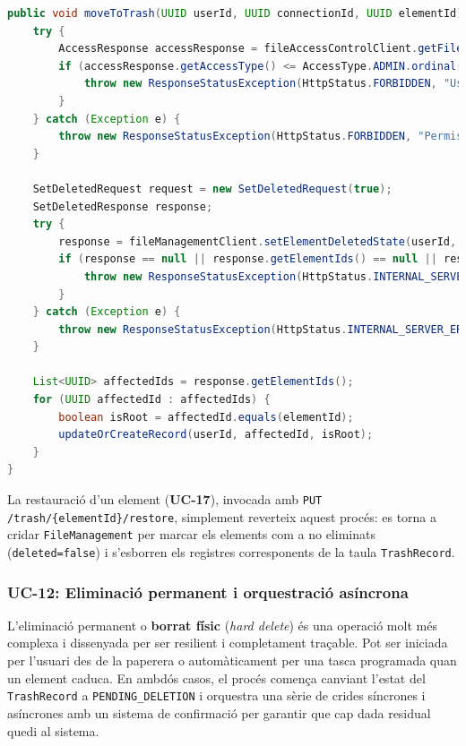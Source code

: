 \begin{lstlisting}[language=Java, caption={Mètode per moure un element a la paperera a `TrashService`}]
public void moveToTrash(UUID userId, UUID connectionId, UUID elementId) {
    try {
        AccessResponse accessResponse = fileAccessControlClient.getFileAccess(elementId, userId);
        if (accessResponse.getAccessType() <= AccessType.ADMIN.ordinal()) {
            throw new ResponseStatusException(HttpStatus.FORBIDDEN, "User does not have WRITE access to the element.");
        }
    } catch (Exception e) {
        throw new ResponseStatusException(HttpStatus.FORBIDDEN, "Permission check failed for the element");
    }

    SetDeletedRequest request = new SetDeletedRequest(true);
    SetDeletedResponse response;
    try {
        response = fileManagementClient.setElementDeletedState(userId, connectionId, elementId, request);
        if (response == null || response.getElementIds() == null || response.getElementIds().isEmpty()) {
            throw new ResponseStatusException(HttpStatus.INTERNAL_SERVER_ERROR, "Failed to move element to trash");
        }
    } catch (Exception e) {
        throw new ResponseStatusException(HttpStatus.INTERNAL_SERVER_ERROR, "Error communicating with file management service");
    }

    List<UUID> affectedIds = response.getElementIds();
    for (UUID affectedId : affectedIds) {
        boolean isRoot = affectedId.equals(elementId);
        updateOrCreateRecord(userId, affectedId, isRoot);
    }
}
\end{lstlisting}

La restauració d'un element (\textbf{UC-17}), invocada amb \texttt{PUT /trash/\{elementId\}/restore}, simplement reverteix aquest procés: es torna a cridar \texttt{FileManagement} per marcar els elements com a no eliminats (\texttt{deleted=false}) i s'esborren els registres corresponents de la taula \texttt{TrashRecord}.

\subsubsection{UC-12: Eliminació permanent i orquestració asíncrona}

L'eliminació permanent o \textbf{borrat físic} (\textit{hard delete}) és una operació molt més complexa i dissenyada per ser resilient i completament traçable. Pot ser iniciada per l'usuari des de la paperera o automàticament per una tasca programada quan un element caduca. En ambdós casos, el procés comença canviant l'estat del \texttt{TrashRecord} a \texttt{PENDING\_DELETION} i orquestra una sèrie de crides síncrones i asíncrones amb un sistema de confirmació per garantir que cap dada residual quedi al sistema.

